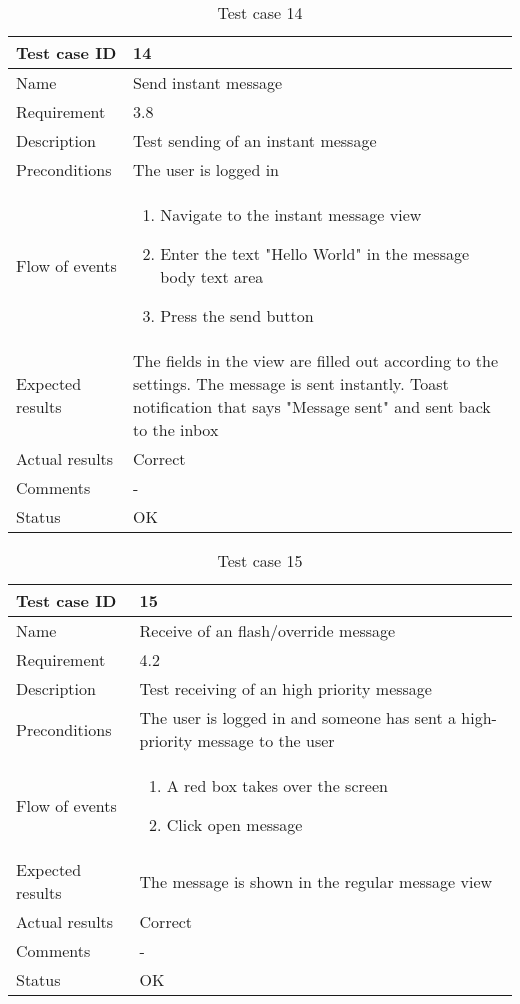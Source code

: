 		\begin{table}
			\begin{tabular}{l|p{10cm}}
				Test case ID & 14 \\ \hline
				Name & Send instant message\\ \hline
				Requirement & 3.8\\ \hline
				Description & Test sending of an instant message\\ \hline
				Preconditions & The user is logged in\\ \hline
				Flow of events & 
					\begin{enumerate}
						\item{}Navigate to the instant message view
						\item{}Enter the text "Hello World" in the message body text area
						\item{}Press the send button
					\end{enumerate} \\ \hline
				Expected results & The fields in the view are filled out according to the settings. The message is sent instantly. Toast notification that says "Message sent" and sent back to the inbox \\ \hline
				Actual results & Correct\\ \hline
				Comments &-\\ \hline
				Status &OK \\ \hline
			\end{tabular}
			\caption{Test case 14} \label{tab:case14}
		\end{table}

		\begin{table}
			\begin{tabular}{l|p{10cm}}
				Test case ID & 15 \\ \hline
				Name & Receive of an flash/override message\\ \hline
				Requirement & 4.2\\ \hline
				Description & Test receiving of an high priority message\\ \hline
				Preconditions & The user is logged in and someone has sent a high-priority message to the user\\ \hline
				Flow of events & 
					\begin{enumerate}
						\item{}A red box takes over the screen
						\item{}Click open message
					\end{enumerate} \\ \hline
				Expected results & The message is shown in the regular message view\\ \hline
				Actual results & Correct\\ \hline
				Comments & -\\ \hline
				Status & OK \\ \hline
			\end{tabular}
			\caption{Test case 15} \label{tab:case15}
		\end{table}

